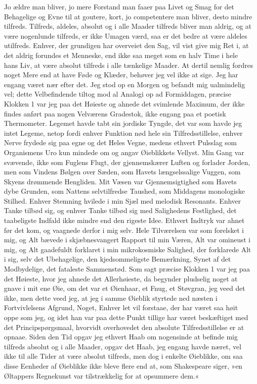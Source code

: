 \documentclass[12pt,a4paper]{article}
\begin{document}
Jo ældre man bliver, jo mere Forstand man faaer paa Livet og Smag for det Behagelige og Evne til at goutere, kort, jo competentere man bliver, desto mindre tilfreds. Tilfreds, aldeles, absolut og i alle Maader tilfreds bliver man aldrig, og at være nogenlunde tilfreds, er ikke Umagen værd, saa er det bedre at være aldeles utilfreds. Enhver, der grundigen har overveiet den Sag, vil vist give mig Ret i, at det aldrig forundes et Menneske, end ikke saa meget som en halv Time i hele hans Liv, at være absolut tilfreds i alle tænkelige Maader. At dertil nemlig fordres noget Mere end at have Føde og Klæder, behøver jeg vel ikke at sige. Jeg har engang været nær efter det. Jeg stod op en Morgen og befandt mig ualmindelig vel; dette Velbefindende tiltog mod al Analogi op ad Formiddagen, præcise Klokken 1 var jeg paa det Høieste og ahnede det svimlende Maximum, der ikke findes anført paa nogen Velværens Gradestok, ikke engang paa et poetisk Thermometer. Legemet havde tabt sin jordiske Tyngde, det var som havde jeg intet Legeme, netop fordi enhver Funktion nød hele sin Tilfredsstillelse, enhver Nerve frydede sig paa egne og det Heles Vegne, medens ethvert Pulsslag som Organismens Uro kun mindede om og angav Øieblikkets Vellyst. Min Gang var svævende, ikke som Fuglens Flugt, der gjennemskærer Luften og forlader Jorden, men som Vindens Bølgen over Sæden, som Havets længselssalige Vuggen, som Skyens drømmende Hengliden. Mit Væsen var Gjennemsigtighed som Havets dybe Grunden, som Nattens selvtilfredse Taushed, som Middagens monologiske Stilhed. Enhver Stemning hvilede i min Sjæl med melodisk Resonants. Enhver Tanke tilbød sig, og enhver Tanke tilbød sig med Salighedens Festlighed, det taabeligste Indfald ikke mindre end den rigeste Idee. Ethvert Indtryk var ahnet før det kom, og vaagnede derfor i mig selv. Hele Tilværelsen var som forelsket i mig, og Alt bævede i skjæbnesvangert Rapport til min Væren, Alt var omineust i mig, og Alt gaadefuldt forklaret i min mikrokosmiske Salighed, der forklarede Alt i sig, selv det Ubehagelige, den kjedsommeligste Bemærkning, Synet af det Modbydelige, det fataleste Sammenstød. Som sagt præcise Klokken 1 var jeg paa det Høieste, hvor jeg ahnede det Allerhøieste, da begynder pludselig noget at gnave i mit ene Øie, om det var et Øienhaar, et Fnug, et Støvgran, jeg veed det ikke, men dette veed jeg, at jeg i samme Øieblik styrtede ned næsten i Fortvivlelsens Afgrund, Noget, Enhver let vil forstaae, der har været saa høit oppe som jeg, og idet han var paa dette Punkt tillige har været beskæftiget med det Principspørgsmaal, hvorvidt overhovedet den absolute Tilfredsstillelse er at opnaae. Siden den Tid opgav jeg ethvert Haab om nogensinde at befinde mig tilfreds absolut og i alle Maader, opgav det Haab, jeg engang havde næret, vel ikke til alle Tider at være absolut tilfreds, men dog i enkelte Øieblikke, om saa disse Eenheder af Øieblikke ikke bleve flere end at, som Shakespeare siger, »en Øltappers Regnekunst var tilstrækkelig for at opsummere dem.«
\end{document}
